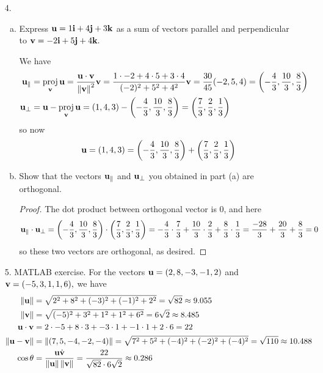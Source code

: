 \documentclass{article}
\newcommand{\vu}{{\bf u}}
\newcommand{\vv}{{\bf v}}
\newcommand{\vi}{{\bf i}}
\newcommand{\vj}{{\bf j}}
\newcommand{\vk}{{\bf k}}
\DeclareMathOperator{\proj}{proj}
\begin{document}
\begin{itemize}
\begin{enumerate}[(a)]
		\end{enumerate}

		\newpage
	\item[4.]
		\begin{enumerate}[(a)]
			\item Express $\vu = 1\vi + 4\vj + 3\vk$ as a sum of vectors parallel and perpendicular to $\vv=-2\vi + 5\vj + 4\vk.$
				\begin{soln}
					We have
					\begin{align*}
						\vu_{\parallel} &= \proj_{\vv}\vu = \frac{\vu\cdot\vv}{\left\lVert \vv \right\rVert^2}\vv = \frac{1\cdot -2 + 4\cdot 5 + 3\cdot 4}{(-2)^2+5^2+4^2}\vv = \frac{30}{45}(-2, 5, 4) = \left( -\frac{4}{3}, \frac{10}{3}, \frac{8}{3} \right) \\
						\vu_{\bot} &= \vu - \proj_{\vv}\vu = (1, 4, 3) - \left( -\frac{4}{3}, \frac{10}{3}, \frac{8}{3} \right) = \left( \frac{7}{3}, \frac{2}{3}, \frac{1}{3} \right)
					\end{align*}
					so now
					\begin{align*}
						\vu = (1, 4, 3) = \left( -\frac{4}{3}, \frac{10}{3}, \frac{8}{3} \right) + \left( \frac{7}{3}, \frac{2}{3}, \frac{1}{3} \right)
					\end{align*}
				\end{soln}

			\item Show that the vectors $\vu_{\parallel}$ and $\vu_{\bot}$ you obtained in part (a) are orthogonal.
				\begin{proof}
					The dot product between orthogonal vector is 0, and here
					\begin{align*}
						\vu_{\parallel}\cdot\vu_{\bot} &= \left( -\frac{4}{3}, \frac{10}{3}, \frac{8}{3} \right)\cdot \left( \frac{7}{3}, \frac{2}{3}, \frac{1}{3} \right) = -\frac{4}{3}\cdot\frac{7}{3} + \frac{10}{3}\cdot \frac{2}{3} + \frac{8}{3}\cdot \frac{1}{3} = \frac{-28}{3} + \frac{20}{3} + \frac{8}{3} = 0
					\end{align*}
					so these two vectors are orthogonal, as desired.
				\end{proof}

		\end{enumerate}

	\item[5.] MATLAB exercise. For the vectors $\vu = (2, 8, -3, -1, 2)$ and $\vv = (-5, 3, 1, 1, 6),$ we have
		\begin{align*}
			\left\lVert \vu \right\rVert &= \sqrt{2^2+8^2+(-3)^2+(-1)^2+2^2} = \sqrt{82}\approx 9.055 \\
			\left\lVert \vv \right\rVert &= \sqrt{(-5)^2 + 3^2 + 1^2+1^2+6^2} = 6\sqrt{2} \approx8.485 \\
			\vu\cdot\vv &= 2\cdot-5 + 8\cdot3 + -3\cdot1 + -1\cdot 1 + 2\cdot 6 = 22 \\
			\left\lVert \vu-\vv \right\rVert &= \left\lVert (7, 5, -4, -2, -4) \right\rVert = \sqrt{7^2+5^2+(-4)^2+(-2)^2+(-4)^2} = \sqrt{110} \approx10.488 \\
			\cos \theta &= \frac{\vu\dot \vv}{\left\lVert \vu \right\rVert\left\lVert \vv \right\rVert} = \frac{22}{\sqrt{82}\cdot 6\sqrt{2}} \approx0.286
		\end{align*}


\end{itemize}
\end{document}
